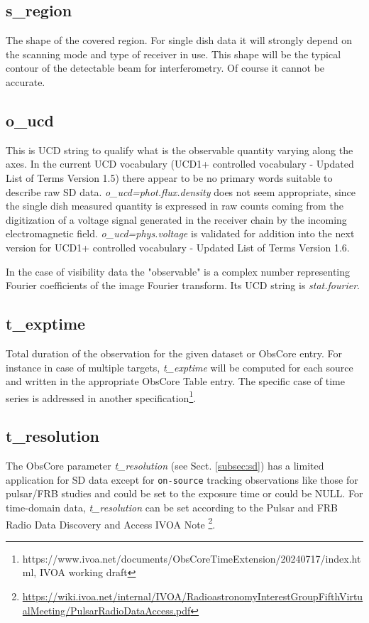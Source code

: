 \documentclass[11pt,a4paper]{ivoa}
\begin{document}
\subsection{s\_region}
The shape of the covered region. 
For single dish data it will strongly depend on the scanning mode and type of receiver in use.
This shape will be the typical contour of the detectable beam for interferometry. Of course it cannot be accurate.

\subsection{o\_ucd}
This is UCD string  to qualify what is the observable quantity varying along the axes. 
In the current UCD vocabulary (UCD1+ controlled vocabulary - Updated List of Terms Version 1.5) there appear to be no primary words suitable to describe raw SD data. \emph{o\_ucd=phot.flux.density} does not seem appropriate, since the single dish measured quantity is expressed in raw counts coming from the digitization of a voltage signal generated in the receiver chain by the incoming electromagnetic field. 
\emph{o\_ucd=phys.voltage} is validated for addition into the next version for UCD1+ controlled vocabulary - Updated List of Terms Version 1.6.

In the case of visibility data the "observable" is a complex number representing Fourier
coefficients of the image Fourier transform. Its UCD string is \emph{stat.fourier}.

\subsection{t\_exptime}
Total duration of the observation for the given dataset or ObsCore entry. For instance  in case of multiple targets, \emph{t\_exptime}
will be computed for each source and written in the appropriate ObsCore Table entry. The specific case of time series is addressed in another
specification\footnote{https://www.ivoa.net/documents/ObsCoreTimeExtension/20240717/index.html, IVOA working draft}.


\subsection{t\_resolution}
The ObsCore parameter \emph{t\_resolution} (see Sect. \ref{subsec:sd}) has a limited application for SD data
except for \texttt{on-source} tracking observations like those for pulsar/FRB studies and could be set to the
exposure time or could be NULL. For time-domain data, \emph{t\_resolution} can be set according to the Pulsar
and FRB Radio Data Discovery and Access IVOA Note \footnote{\url{https://wiki.ivoa.net/internal/IVOA/RadioastronomyInterestGroupFifthVirtualMeeting/PulsarRadioDataAccess.pdf}}.
\end{document}
